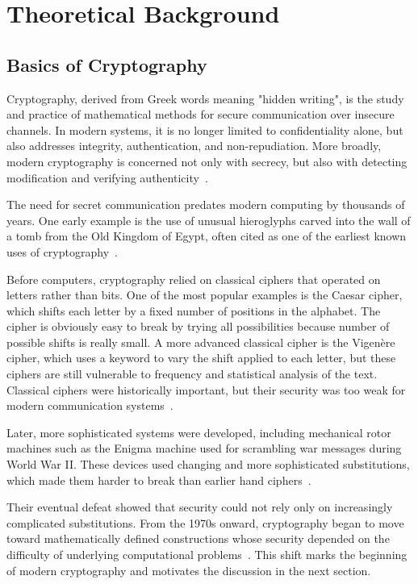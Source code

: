\chapter{Theoretical Background}

\section{Basics of Cryptography} 

Cryptography, derived from Greek words meaning "hidden writing", is the study
and practice of mathematical methods for secure communication over insecure
channels. In modern systems, it is no longer limited to confidentiality alone,
but also addresses integrity, authentication, and non-repudiation. More
broadly, modern cryptography is concerned not only with secrecy, but also with
detecting modification and verifying
authenticity~\cite{diffie1976newDirections,ibm2023cryptography}.

The need for secret communication predates modern computing by thousands of
years. One early example is the use of unusual hieroglyphs carved into the wall
of a tomb from the Old Kingdom of Egypt, often cited as one of the earliest
known uses of cryptography~\cite{schneider2024ibmhistory}.

Before computers, cryptography relied on classical ciphers that operated on
letters rather than bits. One of the most popular examples is the Caesar
cipher, which shifts each letter by a fixed number of positions in the
alphabet. The cipher is obviously easy to break by trying all possibilities
because number of possible shifts is really small. A more advanced classical
cipher is the Vigen\`ere cipher, which uses a keyword to vary the shift applied
to each letter, but these ciphers are still vulnerable to frequency and
statistical analysis of the text. Classical ciphers were historically important, but their
security was too weak for modern communication
systems~\cite{aumasson2017serious}.

Later, more sophisticated systems were developed, including mechanical rotor
machines such as the Enigma machine used for scrambling war messages during
World War II. These devices used changing and more sophisticated substitutions,
which made them harder to break than earlier hand
ciphers~\cite{schneider2024ibmhistory}.

Their eventual defeat showed that security could not rely only on increasingly
complicated substitutions. From the 1970s onward, cryptography began to move
toward mathematically defined constructions whose security depended on the
difficulty of underlying computational problems~\cite{diffie1976newDirections}. This shift marks the beginning
of modern cryptography and motivates the discussion in the next
section.

